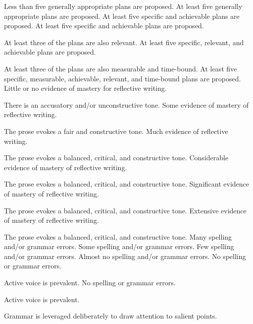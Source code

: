 \documentclass{../fal_assignment}
\begin{document}
\begin{markingrubric}
        \grade \fail	Less than five generally appropriate plans are proposed.
        \grade 		At least five generally appropriate plans are proposed. 
        \grade 		At least five specific and achievable plans are proposed. 
        \grade 		At least five specific and achievable plans are proposed. 
        \par 		At least three of the plans are also relevant.
        \grade 		At least five specific, relevant, and achievable plans are proposed. 
        \par 		At least three of the plans are also measurable and time-bound.
        \grade 		At least five specific, measurable, achievable, relevant, and time-bound plans are proposed. 
%
        \grade\fail 	Little or no evidence of mastery for reflective writing.
         \par 		There is an accusatory and/or unconstructive tone.
        \grade 		Some evidence of mastery of reflective writing.
         \par 		The prose evokes a fair and constructive tone.
        \grade 		Much evidence of reflective writing.
         \par 		The prose evokes a balanced, critical, and constructive tone.
        \grade 		Considerable evidence of mastery of reflective writing.
         \par 		The prose evokes a balanced, critical, and constructive tone.
        \grade 		Significant evidence of mastery of reflective writing.
         \par 		The prose evokes a balanced, critical, and constructive tone.
        \grade 		Extensive evidence of mastery of reflective writing.
         \par 		The prose evokes a balanced, critical, and constructive tone.
%
        \grade  \fail	Many spelling and/or grammar errors.
        \grade 		Some spelling and/or grammar errors.  
        \grade 		Few spelling and/or grammar errors.
        \grade 		Almost no spelling and/or grammar errors.
        \grade 		No spelling or grammar errors.
        \par 		Active voice is prevalent.
        \grade 		No spelling or grammar errors.
        \par 		Active voice is prevalent.
        \par 		Grammar is leveraged deliberately to draw attention to salient points.     

\end{markingrubric}
\end{document}
